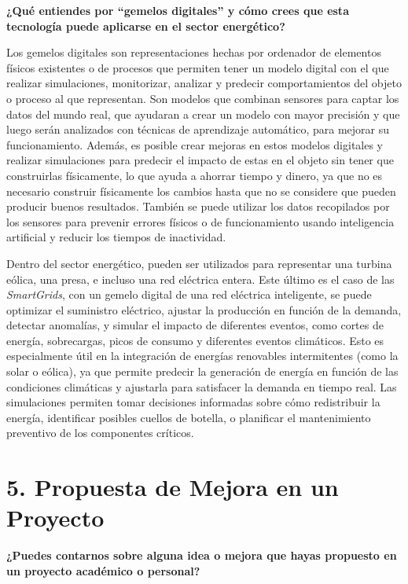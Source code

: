 \documentclass[12pt,a4paper]{article}
\begin{document}
\textbf{¿Qué entiendes por “gemelos digitales” y cómo crees que esta
tecnología puede aplicarse en el sector energético?}

Los gemelos digitales son representaciones hechas por ordenador de elementos físicos existentes o de procesos que permiten tener un modelo digital con el que realizar simulaciones, monitorizar, analizar y predecir comportamientos del objeto o proceso al que representan. Son modelos que combinan sensores para captar los datos del mundo real, que ayudaran a crear un modelo con mayor precisión y que luego serán analizados con técnicas de aprendizaje automático, para mejorar su funcionamiento. Además, es posible crear mejoras en estos modelos digitales y realizar simulaciones para predecir el impacto de estas en el objeto sin tener que construirlas físicamente, lo  que ayuda a ahorrar tiempo y dinero, ya que no es necesario construir físicamente los cambios hasta que no se considere que pueden producir buenos resultados. También se puede utilizar los datos recopilados por los sensores para prevenir errores físicos o de funcionamiento usando inteligencia artificial y reducir los tiempos de inactividad.

Dentro del sector energético, pueden ser utilizados para representar una turbina eólica, una presa, e incluso una red eléctrica entera. Este último es el caso de las \textit{SmartGrids}, con un gemelo digital de una red eléctrica inteligente, se puede optimizar el suministro eléctrico, ajustar la producción en función de la demanda, detectar anomalías, y simular el impacto de diferentes eventos, como cortes de energía, sobrecargas, picos de consumo y diferentes eventos climáticos. Esto es especialmente útil en la integración de energías renovables intermitentes (como la solar o eólica), ya que permite predecir la generación de energía en función de las condiciones climáticas y ajustarla para satisfacer la demanda en tiempo real. Las simulaciones permiten tomar decisiones informadas sobre cómo redistribuir la energía, identificar posibles cuellos de botella, o planificar el mantenimiento preventivo de los componentes críticos.

\section*{5. Propuesta de Mejora en un Proyecto}

\textbf{¿Puedes contarnos sobre alguna idea o mejora que hayas propuesto en un proyecto académico o personal?}
\end{document}
